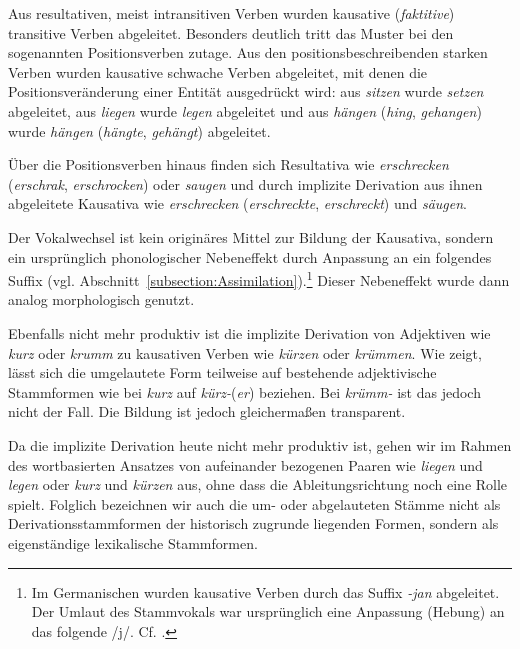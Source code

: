 Aus resultativen, meist intransitiven Verben wurden kausative (\textit{faktitive}) transitive Verben abgeleitet. Besonders deutlich tritt das Muster bei den sogenannten Positionsverben zutage. Aus den positionsbeschreibenden starken Verben wurden kausative schwache Verben abgeleitet, mit denen die Positionsveränderung einer Entität ausgedrückt wird: aus \textit{sitzen} wurde \textit{setzen} abgeleitet, aus \textit{liegen} wurde \textit{legen} abgeleitet und aus \textit{hängen} (\textit{hing}, \textit{gehangen}) wurde \textit{hängen} (\textit{hängte}, \textit{gehängt}) abgeleitet.

Über die Positionsverben hinaus finden sich Resultativa wie \textit{erschrecken} (\textit{erschrak}, \textit{erschrocken}) oder \textit{saugen} und durch implizite Derivation aus ihnen abgeleitete Kausativa wie \textit{erschrecken} (\textit{erschreckte}, \textit{erschreckt}) und \textit{säugen}.

Der Vokalwechsel ist kein originäres Mittel zur Bildung der Kausativa, sondern ein ursprünglich phonologischer Nebeneffekt durch Anpassung an ein folgendes Suffix (vgl. Abschnitt~\ref{subsection:Assimilation}).\footnote{Im Germanischen wurden kausative Verben durch das Suffix \textit{-jan} abgeleitet. Der Umlaut des Stammvokals war ursprünglich eine Anpassung (Hebung) an das folgende /j/. Cf. \citet[61--62]{Wilmanns1896Wb}.} Dieser Nebeneffekt wurde dann analog morphologisch genutzt.

Ebenfalls nicht mehr produktiv ist die implizite Derivation von Adjektiven wie \textit{kurz} oder \textit{krumm} zu kausativen Verben wie \textit{kürzen} oder \textit{krümmen}. Wie \citet[93]{Echenlohr1999} zeigt, lässt sich die umgelautete Form teilweise auf bestehende adjektivische Stammformen wie bei \textit{kurz} auf \textit{kürz-}(\textit{er}) beziehen. Bei \textit{krümm-} ist das jedoch nicht der Fall. Die Bildung ist jedoch gleichermaßen transparent.

Da die implizite Derivation heute nicht mehr produktiv ist, gehen wir im Rahmen des wortbasierten Ansatzes von aufeinander bezogenen Paaren wie \textit{liegen} und \textit{legen} oder \textit{kurz} und \textit{kürzen} aus, ohne dass die Ableitungsrichtung noch eine Rolle spielt. Folglich bezeichnen wir auch die um- oder abgelauteten Stämme nicht als Derivationsstammformen der historisch zugrunde liegenden Formen, sondern als eigenständige lexikalische Stammformen.

